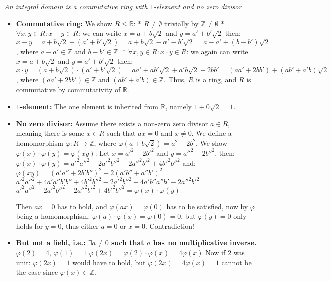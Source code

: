 \documentclass[
]{article}
\begin{document}
\emph{An integral domain is a commutative ring with \(1\)-element and no
zero divisor}

\begin{itemize}
\item
  \textbf{Commutative ring:} We show \(R \leq \mathbb{R}\): *
  \(R \neq \emptyset\) trivially by \(\mathbb{Z} \neq \emptyset\) *
  \(\forall x,y \in R: x-y \in R\): we can write \(x = a + b \sqrt{2}\)
  and \(y = a' + b' \sqrt{2}\) then:
  \(x-y = a + b \sqrt{2} - (a' + b' \sqrt{2}) = a + b\sqrt{2} - a' - b'\sqrt{2} = a-a' + (b-b')\sqrt{2}\),
  where \(a-a' \in \mathbb{Z}\) and \(b-b'\in \mathbb{Z}\). *
  \(\forall x,y \in R: x \cdot y \in R\): we again can write
  \(x = a + b \sqrt{2}\) and \(y = a' + b' \sqrt{2}\) then:
  \(x \cdot y = (a + b \sqrt{2}) \cdot (a' + b'\sqrt{2}) = aa' + ab'\sqrt{2} + a'b\sqrt{2} + 2bb' = (aa'+2bb') + (ab' + a'b)\sqrt{2}\),
  where \((aa'+2bb') \in \mathbb{Z}\) and
  \((ab' + a'b) \in \mathbb{Z}\). Thus, \(R\) is a ring, and \(R\) is
  commutative by commutativity of \(\mathbb{R}\).
\item
  \textbf{\(1\)-element:} The one element is inherited from
  \(\mathbb{R}\), namely \(1 + 0 \sqrt{2} = 1\).
\item
  \textbf{No zero divisor:} Assume there exists a non-zero zero divisor
  \(a \in R\), meaning there is some \(x \in R\) such that \(ax = 0\)
  and \(x \neq 0\). We define a homomorphism
  \(\varphi: R \mapsto \mathbb{Z}\), where
  \(\varphi(a+b\sqrt{2}) = a^2 -2b^2\). We show
  \(\varphi(x) \cdot \varphi(y) = \varphi(xy)\): Let
  \(x = a'^2 - 2b'^2\) and \(y = a''^2 - 2b''^2\), then:
  \(\varphi(x) \cdot \varphi(y) = a'^2a''^2 - 2a'^2b''^2 - 2a''^2b'^2 + 4b'^2b''^2\)
  and: \(\varphi(xy) = (a'a'' + 2b'b'')^2 - 2(a'b'' + a''b')^2 =\)
  \(a'^2a''^2 + 4a'a''b'b'' + 4 b'^2b''^2 - 2a'^2b''^2 - 4a'b''a''b' - 2a''^2b'^2 =\)
  \(a'^2a''^2 - 2a'^2b''^2 - 2a''^2b'^2 + 4b'^2b''^2 = \varphi(x) \cdot \varphi(y)\)

  Then \(ax = 0\) has to hold, and \(\varphi(ax) = \varphi(0)\) has to
  be satisfied, now by \(\varphi\) being a homomorphism:
  \(\varphi(a) \cdot \varphi(x) = \varphi(0) = 0\), but
  \(\varphi(y) = 0\) only holds for \(y = 0\), thus either \(a = 0\) or
  \(x = 0\). Contradiction!
\item
  \textbf{But not a field, i.e.: \(\exists a \neq 0\) such that \(a\)
  has no multiplicative inverse.} \(\varphi(2) = 4\), \(\varphi(1) = 1\)
  \(\varphi(2x)\) = \(\varphi(2) \cdot \varphi(x) = 4 \varphi(x)\) Now
  if \(2\) was unit: \(\varphi(2x) = 1\) would have to hold, but
  \(\varphi(2x) = 4\varphi(x) = 1\) cannot be the case since
  \(\varphi(x) \in \mathbb{Z}\).
\end{itemize}
\end{document}
